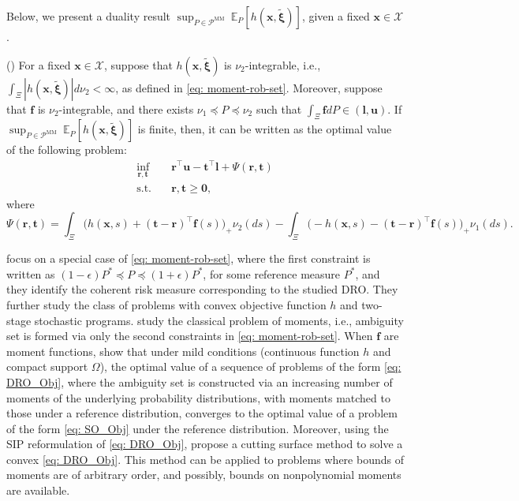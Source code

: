 \documentclass[final,onefignum,onetabnum]{class}
\newcommand{\ee}[2]{\mathbb{E}_{#1} \left[ #2 \right]}
\newcommand{\bs}[1]{\boldsymbol{#1}} %
\newcommand{\Cs}[1]{\mathcal{#1}} %
\newcommand{\txi}{\tilde{\bs{\xi}}}
\newcommand{\dro}{DRO}
\newcommand{\st}{\text{s.t.}}
\begin{document}
Below, we present a duality result $\sup_{P \in \Cs{P}^{\text{MM}}} \ \ee{P}{h(\bs{x},\txi)}$, given a fixed $\bs{x} \in \Cs{X}$. 
\begin{theorem}{(\citet[Proposition~2.1]{shapiro2004minmax})}
    \label{thm: rev.dual_generalizedmoments}
    For a fixed $\bs{x} \in \Cs{X}$, suppose that $h(\bs{x},\txi)$ is $\nu_{2}$-integrable, i.e., $\int_{\Xi} |h(\bs{x},\txi)| d \nu_{2} < \infty$, as defined in \eqref{eq: moment-rob-set}. Moreover, suppose that $\bs{f}$ is $\nu_{2}$-integrable, and there exists  $\nu_1 \preceq P \preceq \nu_2$ such that  $\int_{\Xi} \bs{f} d P \in (\bs{l}, \bs{u})$. If $\sup_{P \in \Cs{P}^{\text{MM}}} \ \ee{P}{h(\bs{x},\txi)}$  is finite, then, it can be written  as the optimal value of the following problem:
    \begin{align*}
        \inf_{\bs{r},\bs{t}} \ & \bs{r}^{\top} \bs{u} -\bs{t}^{\top} \bs{l} + \Psi(\bs{r},\bs{t}) \\
        \st \quad & \bs{r},\bs{t} \ge \bs{0},
    \end{align*}
    where 
    $$\Psi(\bs{r},\bs{t})=\int_{\Xi} \Big(h(\bs{x},s)+ (\bs{t}-\bs{r})^{\top}\bs{f}(s) \Big)_{+}  \nu_{2}(ds) - \int_{\Xi} \Big(-h(\bs{x},s)- (\bs{t}-\bs{r})^{\top}\bs{f}(s) \Big)_{+} \nu_{1}(ds).$$
\end{theorem}



\citet{shapiro2004minmax} focus on a special case of \eqref{eq: moment-rob-set}, where the first constraint is written as $(1-\epsilon)P^{*} \preceq P \preceq (1+\epsilon)P^{*}$, for some reference measure $P^{*}$, and they identify the coherent risk measure corresponding to the studied  \dro. They further study the class of problems with convex objective function $h$ and two-stage stochastic programs.  \citet{popescu2005semidefinite,bertsimas2005optimal,mehrotra2014semi}  study the classical problem of moments, i.e., ambiguity set is formed via only  the second constraints in \eqref{eq: moment-rob-set}. When   $\bs{f}$ are moment functions, \citet{mehrotra2014semi} show that under mild conditions (continuous function $h$ and compact support $\Omega$), the optimal value of a sequence of problems of the form  \eqref{eq: DRO_Obj}, where the ambiguity set is constructed via an increasing  number of moments of the underlying probability distributions, with moments matched to those  under a reference distribution, converges to the optimal value of a problem of the form  \eqref{eq: SO_Obj} under the reference distribution. 
Moreover, using the SIP reformulation of \eqref{eq: DRO_Obj}, \citet{mehrotra2014semi} propose a cutting surface method to solve a convex \eqref{eq: DRO_Obj}. This method %
can be applied to problems where
bounds of moments are of arbitrary order, and possibly, bounds on nonpolynomial moments are available. 
\end{document}
